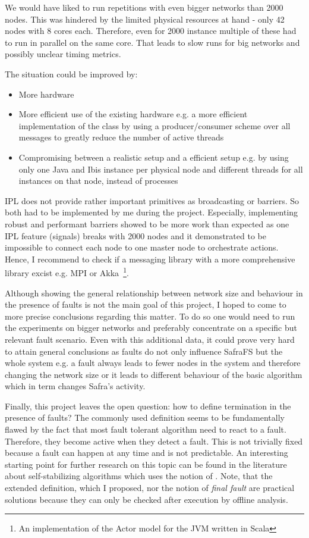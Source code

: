 We would have liked to run repetitions with even bigger networks than 2000 nodes.
This was hindered by the limited physical resources at hand - only 42 nodes with 8 cores each.
Therefore, even for 2000 instance multiple of these had to run in parallel on the same core. 
That leads to slow runs for big networks and possibly unclear timing metrics.

The situation could be improved by:
\begin{itemize}
    \item More hardware
    \item More efficient use of the existing hardware e.g. a more efficient implementation of the  class by using a producer/consumer scheme over all messages to greatly reduce the number of active threads
    \item Compromising between a realistic setup and a efficient setup e.g. by using only one Java and Ibis instance per physical node and different threads for all instances on that node, instead of processes
\end{itemize}


IPL does not provide rather important primitives as broadcasting or barriers.
So both had to be implemented by me during the project.
Especially, implementing robust and performant barriers showed to be more work than expected as one IPL feature (signals) breaks with 2000 nodes and it demonstrated to be impossible to connect each node to one master node to orchestrate actions.
Hence, I recommend to check if a messaging library with a more comprehensive library excist e.g. MPI or Akka~\footnote{An implementation of the Actor model for the JVM written in Scala}.

Although showing the general relationship between network size and behaviour in the presence of faults is not the main goal of this project, I hoped to come to more precise conclusions regarding this matter.
To do so one would need to run the experiments on bigger networks and preferably concentrate on a specific but relevant fault scenario.
Even with this additional data, it could prove very hard to attain general conclusions as faults do not only influence SafraFS but the whole system e.g. a fault always leads to fewer nodes in the system and therefore changing the network size or it leads to different behaviour of the basic algorithm which in term changes Safra's activity.

Finally, this project leaves the open question: how to define termination in the presence of faults?
The commonly used definition seems to be fundamentally flawed by the fact that most fault tolerant algorithm need to react to a fault.
Therefore, they become active when they detect a fault.
This is not trivially fixed because a fault can happen at any time and is not predictable.
An interesting starting point for further research on this topic can be found in the literature about self-stabilizing algorithms which uses the notion of .
Note, that the extended definition, which I proposed, nor the notion of \textit{final fault} are practical solutions because they can only be checked after execution by offline analysis.